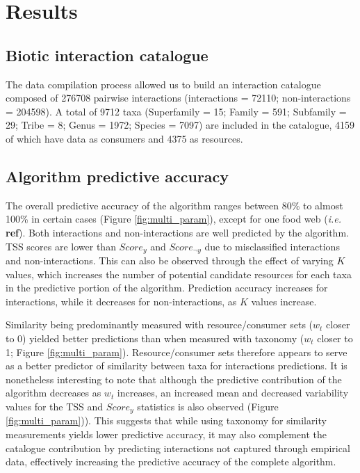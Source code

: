 \documentclass[letterpaper]{article}
\begin{document}
\section{Results}
    \subsection{Biotic interaction catalogue}
The data compilation process allowed us to build an interaction catalogue composed of 276708 pairwise interactions (interactions = 72110; non-interactions = 204598). A total of 9712 taxa (Superfamily = 15; Family = 591; Subfamily = 29; Tribe = 8; Genus = 1972; Species = 7097) are included in the catalogue, 4159 of which have data as consumers and 4375 as resources.

    \subsection{Algorithm predictive accuracy}
The overall predictive accuracy of the algorithm ranges between 80\% to almost 100\% in certain cases (Figure \ref{fig:multi_param}), except for one food web (\textit{i.e.} \textbf{ref}). Both interactions and non-interactions are well predicted by the algorithm. TSS scores are lower than $Score_y$ and $Score_{\neg y}$ due to misclassified interactions and non-interactions. This can also be observed through the effect of varying $K$ values, which increases the number of potential candidate resources for each taxa in the predictive portion of the algorithm. Prediction accuracy increases for interactions, while it decreases for non-interactions, as $K$ values increase.

Similarity being predominantly measured with resource/consumer sets ($w_t$ closer to 0) yielded better predictions than when measured with taxonomy ($w_t$ closer to 1; Figure \ref{fig:multi_param}). Resource/consumer sets therefore appears to serve as a better predictor of similarity between taxa for interactions predictions. It is nonetheless interesting to note that although the predictive contribution of the algorithm decreases as $w_t$ increases, an increased mean and decreased variability values for the TSS and $Score_y$ statistics is also observed (Figure \ref{fig:multi_param})). This suggests that while using taxonomy for similarity measurements yields lower predictive accuracy, it may also complement the catalogue contribution by predicting interactions not captured through empirical data, effectively increasing the predictive accuracy of the complete algorithm.
\end{document}
